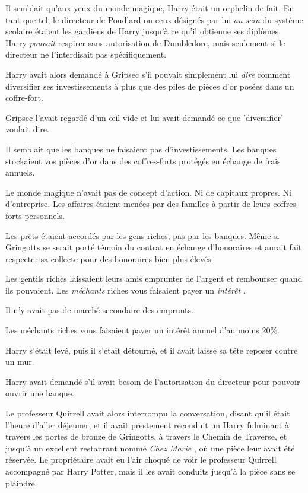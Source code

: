Il semblait qu'aux yeux du monde magique, Harry était un orphelin de fait. En tant que tel, le directeur de Poudlard ou ceux désignés par lui \emph{au sein}  du système scolaire étaient les gardiens de Harry jusqu'à ce qu'il obtienne ses diplômes. Harry \emph{pouvait}  respirer sans autorisation de Dumbledore, mais seulement si le directeur ne l'interdisait pas spécifiquement.

Harry avait alors demandé à Gripsec s'il pouvait simplement lui \emph{dire}  comment diversifier ses investissements à plus que des piles de pièces d'or posées dans un coffre-fort.

Gripsec l'avait regardé d'un œil vide et lui avait demandé ce que 'diversifier' voulait dire.

Il semblait que les banques ne faisaient pas d'investissements. Les banques stockaient vos pièces d'or dans des coffres-forts protégés en échange de frais annuels.

Le monde magique n'avait pas de concept d'action. Ni de capitaux propres. Ni d'entreprise. Les affaires étaient menées par des familles à partir de leurs coffres-forts personnels.

Les prêts étaient accordés par les gens riches, pas par les banques. Même si Gringotts se serait porté témoin du contrat en échange d'honoraires et aurait fait respecter sa collecte pour des honoraires bien plus élevés.

Les gentils riches laissaient leurs amis emprunter de l'argent et rembourser quand ils pouvaient. Les \emph{méchants}  riches vous faisaient payer un \emph{intérêt} .

Il n'y avait pas de marché secondaire des emprunts.

Les méchants riches vous faisaient payer un intérêt annuel d'au moins 20\%.

Harry s'était levé, puis il s'était détourné, et il avait laissé sa tête reposer contre un mur.

Harry avait demandé s'il avait besoin de l'autorisation du directeur pour pouvoir ouvrir une banque.

Le professeur Quirrell avait alors interrompu la conversation, disant qu'il était l'heure d'aller déjeuner, et il avait prestement reconduit un Harry fulminant à travers les portes de bronze de Gringotts, à travers le Chemin de Traverse, et jusqu'à un excellent restaurant nommé \emph{Chez Marie} , où une pièce leur avait été réservée. Le propriétaire avait eu l'air choqué de voir le professeur Quirrell accompagné par Harry Potter, mais il les avait conduits jusqu'à la pièce sans se plaindre.

